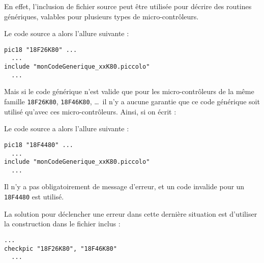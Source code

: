 En effet, l'inclusion de fichier source peut être utilisée pour décrire des routines génériques, valables pour plusieurs types de micro-contrôleurs.

Le code source a alors l'allure suivante :
\begin{lstlisting}[language=piccolo]
pic18 "18F26K80" ...
  ...
include "monCodeGenerique_xxK80.piccolo"
  ...
\end{lstlisting}

Mais si le code générique n'est valide que pour les micro-contrôleurs de la même famille \texttt{18F26K80}, \texttt{18F46K80}, \dots\ il n'y a aucune garantie que ce code générique soit utilisé qu'avec ces micro-contrôleurs. Ainsi, si on écrit :

Le code source a alors l'allure suivante :
\begin{lstlisting}[language=piccolo]
pic18 "18F4480" ...
  ...
include "monCodeGenerique_xxK80.piccolo"
  ...
\end{lstlisting}

Il n'y a pas obligatoirement de message d'erreur, et un code invalide pour un \texttt{18F4480} est utilisé.


La solution pour déclencher une erreur dans cette dernière situation est d'utiliser la construction  dans le fichier inclus  :

\begin{lstlisting}[language=piccolo]
  ...
checkpic "18F26K80", "18F46K80"
  ...
\end{lstlisting}


 